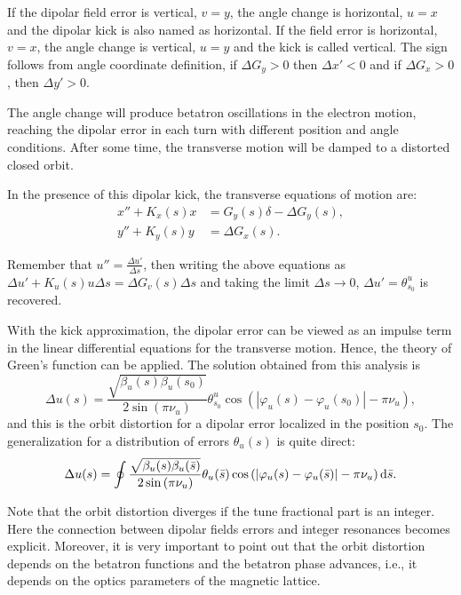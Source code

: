 If the dipolar field error is vertical, $v=y$, the angle change is horizontal, $u=x$ and the dipolar kick is also named as horizontal. If the field error is horizontal, $v=x$, the angle change is vertical, $u=y$ and the kick is called vertical. The sign follows from angle coordinate definition, if $\Delta G_y > 0$ then $\Delta x' < 0$ and if $\Delta G_x > 0$, then $\Delta y' > 0$.

The angle change will produce betatron oscillations in the electron motion, reaching the dipolar error in each turn with different position and angle conditions. After some time, the transverse motion will be damped to a distorted closed orbit. 

In the presence of this dipolar kick, the transverse equations of motion  are:
\begin{align}
    x'' + K_x(s)x &= G_y(s) \delta - \Delta G_y(s), \\
    y'' + K_y(s)y &= \Delta G_x(s).
\end{align}

Remember that $u'' = \frac{\Delta u'}{\Delta s}$, then writing the above equations as $\Delta u' + K_u(s) u \Delta s = \Delta G_v(s) \Delta s$ and taking the limit $\Delta s \rightarrow 0$, $\Delta u' = \theta^{u}_{s_0}$ is recovered. 

With the kick approximation, the dipolar error can be viewed as an impulse term in the linear differential equations for the transverse motion. Hence, the theory of Green's function can be applied. The solution obtained from this analysis is~\cite{wiedemann2007physics}
\begin{equation}
    \Delta u(s) = \dfrac{\sqrt{\beta_{u}(s)\beta_{u}(s_0)}}{2\sin\left(\pi\nu_{u}\right)} \theta_{s_0}^{u} \cos\left( |\varphi_{u}(s) - \varphi_{u}(s_0)| - \pi\nu_{u} \right),
\end{equation}
and this is the orbit distortion for a dipolar error localized in the position $s_0$. The generalization for a distribution of errors $\theta_u(s)$ is quite direct:
\begin{equation}
    \Delta u(s) = \oint \dfrac{\sqrt{\beta_{u}(s)\beta_{u}(\bar{s})}}{2\sin\left(\pi\nu_{u}\right)} \theta_{u}(\bar{s}) \cos\left( |\varphi_{u}(s) - \varphi_{u}(\bar{s})| - \pi\nu_{u} \right) \mathrm{d} \bar{s}.
    \label{eq:orbit_distortion}
\end{equation}

Note that the orbit distortion diverges if the tune fractional part is an integer. Here the connection between dipolar fields errors and integer resonances becomes explicit. Moreover, it is very important to point out that the orbit distortion depends on the betatron functions and the betatron phase advances, i.e., it depends on the optics parameters of the magnetic lattice.
